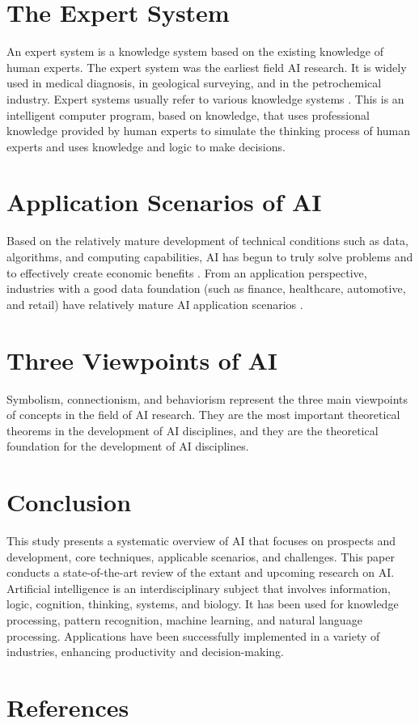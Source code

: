 \documentclass[12pt, a4paper]{article}
\begin{document}
\section{The Expert System}
An expert system is a knowledge system based on the existing knowledge of human experts. The expert system was the earliest field AI research. It is widely used in medical diagnosis, in geological surveying, and in the petrochemical industry. Expert systems usually refer to various knowledge systems \cite{feng2001}. This is an intelligent computer program, based on knowledge, that uses professional knowledge provided by human experts to simulate the thinking process of human experts and uses knowledge and logic to make decisions.

\section{Application Scenarios of AI}
Based on the relatively mature development of technical conditions such as data, algorithms, and computing capabilities, AI has begun to truly solve problems and to effectively create economic benefits \cite{finogeev2019}. From an application perspective, industries with a good data foundation (such as finance, healthcare, automotive, and retail) have relatively mature AI application scenarios \cite{hamet2017}.

\section{Three Viewpoints of AI}
Symbolism, connectionism, and behaviorism represent the three main viewpoints of concepts in the field of AI research. They are the most important theoretical theorems in the development of AI disciplines, and they are the theoretical foundation for the development of AI disciplines.

\section{Conclusion}
This study presents a systematic overview of AI that focuses on prospects and development, core techniques, applicable scenarios, and challenges. This paper conducts a state-of-the-art review of the extant and upcoming research on AI. Artificial intelligence is an interdisciplinary subject that involves information, logic, cognition, thinking, systems, and biology. It has been used for knowledge processing, pattern recognition, machine learning, and natural language processing. Applications have been successfully implemented in a variety of industries, enhancing productivity and decision-making.

\section*{References}

  
\end{document}
